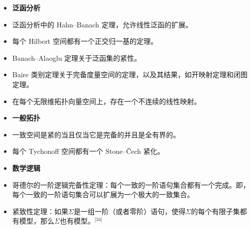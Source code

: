 \begin{itemize}
\item \textbf{泛函分析}  
\item 泛函分析中的 Hahn–Banach 定理，允许线性泛函的扩展。  
\item 每个 Hilbert 空间都有一个正交归一基的定理。  
\item Banach–Alaoglu 定理关于泛函集的紧性。  
\item Baire 类别定理关于完备度量空间的定理，以及其结果，如开映射定理和闭图定理。  
\item 在每个无限维拓扑向量空间上，存在一个不连续的线性映射。
\end{itemize}
\begin{itemize}
\item \textbf{一般拓扑}  
\item 一致空间是紧的当且仅当它是完备的并且是全有界的。  
\item 每个 Tychonoff 空间都有一个 Stone–Čech 紧化。
\end{itemize}
\begin{itemize}
\item \textbf{数学逻辑}  
\item 哥德尔的一阶逻辑完备性定理：每个一致的一阶语句集合都有一个完成。即，每个一致的一阶语句集合可以扩展为一个极大的一致集合。  
\item 紧致性定理：如果\(\Sigma\)是一组一阶（或者零阶）语句，使得\(\Sigma\)的每个有限子集都有模型，那么\(\Sigma\)也有模型。\(^\text{[34]}\)
\end{itemize}